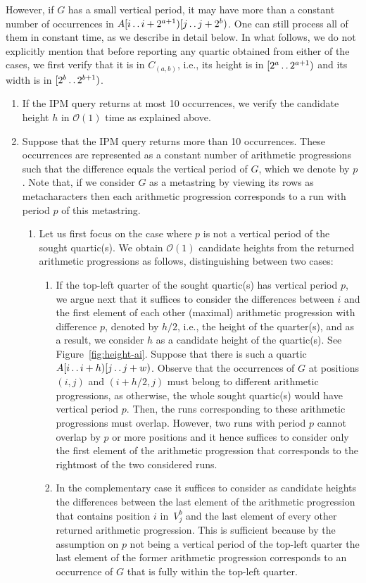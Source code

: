 \documentclass[11pt,letterpaper]{article}
\newcommand{\cO}{\mathcal{O}}
\newcommand{\can}[2]{C_{(#1,#2)}}
\def\dd{\mathinner{.\,.}}
\newcommand{\vmeta}[2]{V_{#1}^{#2}}
\begin{document}
However, if $G$ has a small vertical period, it may have more than a constant number of occurrences in $A[i \dd i + 2^{a+1})[j \dd j + 2^{b})$.
One can still process all of them in constant time, as we describe in detail below.
In what follows, we do not explicitly mention that before reporting any quartic obtained from either of the cases, we first verify that it is in $\can{a}{b}$, i.e., its height is in $[2^a\dd2^{a+1})$ and its width is in $[2^b\dd2^{b+1})$.
\begin{enumerate}
\item If the IPM query returns at most 10 occurrences, we verify the candidate height $h$ in $\cO(1)$ time as explained above.
\item Suppose that the IPM query returns more than 10 occurrences. These occurrences are represented as a constant number of arithmetic progressions such that the difference equals the vertical period of $G$, which we denote by $p$.
Note that, if we consider $G$ as a metastring by viewing its rows as metacharacters then each arithmetic progression corresponds to a run with period $p$ of this metastring.

\begin{enumerate}
\item Let us first focus on the case where $p$ is not a vertical period of the sought quartic(s).
We obtain $\cO(1)$ candidate heights from the returned arithmetic progressions as follows, distinguishing between two cases:
\begin{enumerate}
\item If the top-left quarter of the sought quartic(s) has vertical period $p$, we argue next that it suffices to consider the differences between $i$ and the first element of each other (maximal) arithmetic progression with difference $p$, denoted by $h/2$, i.e., the height of the quarter(s), and as a result, we consider $h$ as a candidate height of the quartic(s). See Figure~\ref{fig:height-ai}.
Suppose that there is such a quartic $A[i \dd i+h)[j \dd j + w)$.
Observe that the occurrences of $G$ at positions $(i,j)$ and $(i+h/2,j)$ must belong to different arithmetic progressions, as otherwise, the whole sought quartic(s) would have vertical period $p$.
Then, the runs corresponding to these arithmetic progressions must overlap. However, two runs with period $p$ cannot overlap by $p$ or more positions and it hence suffices to consider only the first element of the arithmetic progression that corresponds to the rightmost of the two considered runs.
\item In the complementary case it suffices to consider as candidate heights the differences between the last element of the arithmetic progression
that contains position $i$ in~$\vmeta{j}{b}$ and the last element of every other returned arithmetic progression.
This is sufficient because by the assumption on $p$ not being a vertical period of the top-left quarter
the last element of the former arithmetic progression corresponds to an occurrence of $G$ that is fully within the top-left quarter.


\end{enumerate}
\end{enumerate}
\end{enumerate}
\end{document}
